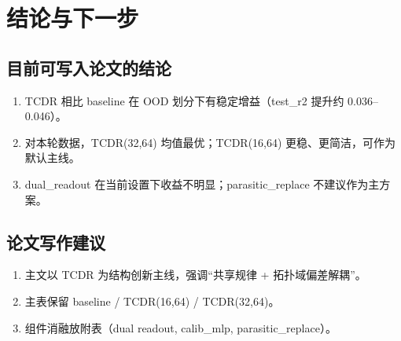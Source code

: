 \documentclass[12pt,a4paper]{ctexart}
\begin{document}
\section{结论与下一步}
\subsection{目前可写入论文的结论}
\begin{enumerate}
  \item TCDR 相比 baseline 在 OOD 划分下有稳定增益（test\_r2 提升约 0.036--0.046）。
  \item 对本轮数据，TCDR(32,64) 均值最优；TCDR(16,64) 更稳、更简洁，可作为默认主线。
  \item dual\_readout 在当前设置下收益不明显；parasitic\_replace 不建议作为主方案。
\end{enumerate}

\subsection{论文写作建议}
\begin{enumerate}
  \item 主文以 TCDR 为结构创新主线，强调“共享规律 + 拓扑域偏差解耦”。
  \item 主表保留 baseline / TCDR(16,64) / TCDR(32,64)。
  \item 组件消融放附表（dual readout, calib\_mlp, parasitic\_replace）。
\end{enumerate}
\end{document}
